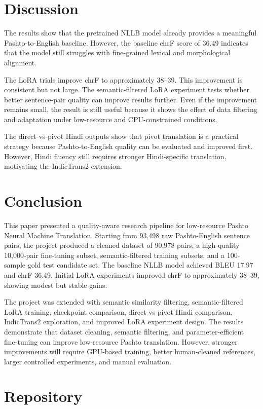 \documentclass[conference]{IEEEtran}
\begin{document}
\section{Discussion}

The results show that the pretrained NLLB model already provides a meaningful Pashto-to-English baseline. However, the baseline chrF score of 36.49 indicates that the model still struggles with fine-grained lexical and morphological alignment.

The LoRA trials improve chrF to approximately 38--39. This improvement is consistent but not large. The semantic-filtered LoRA experiment tests whether better sentence-pair quality can improve results further. Even if the improvement remains small, the result is still useful because it shows the effect of data filtering and adaptation under low-resource and CPU-constrained conditions.

The direct-vs-pivot Hindi outputs show that pivot translation is a practical strategy because Pashto-to-English quality can be evaluated and improved first. However, Hindi fluency still requires stronger Hindi-specific translation, motivating the IndicTrans2 extension.

\section{Conclusion}

This paper presented a quality-aware research pipeline for low-resource Pashto Neural Machine Translation. Starting from 93,498 raw Pashto-English sentence pairs, the project produced a cleaned dataset of 90,978 pairs, a high-quality 10,000-pair fine-tuning subset, semantic-filtered training subsets, and a 100-sample gold test candidate set. The baseline NLLB model achieved BLEU 17.97 and chrF 36.49. Initial LoRA experiments improved chrF to approximately 38--39, showing modest but stable gains.

The project was extended with semantic similarity filtering, semantic-filtered LoRA training, checkpoint comparison, direct-vs-pivot Hindi comparison, IndicTrans2 exploration, and improved LoRA experiment design. The results demonstrate that dataset cleaning, semantic filtering, and parameter-efficient fine-tuning can improve low-resource Pashto translation. However, stronger improvements will require GPU-based training, better human-cleaned references, larger controlled experiments, and manual evaluation.

\section*{Repository}
\end{document}

